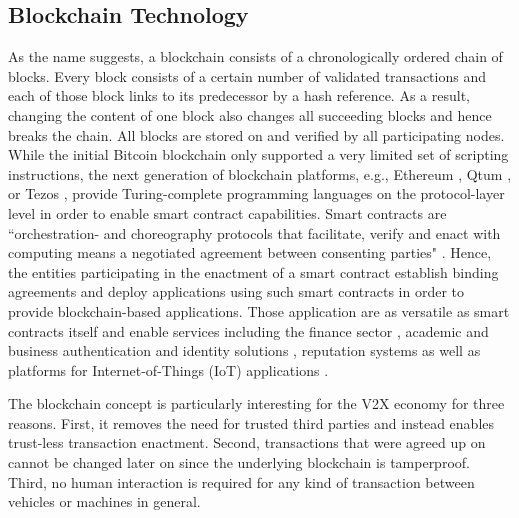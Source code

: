 \documentclass{llncs}
\begin{document}
{		%
		
		\subsection{Blockchain Technology}
			\label{ss:blockchain-intro}
			
			As the name suggests, a blockchain consists of a chronologically ordered chain of blocks. Every block consists of a certain number of validated transactions and each of those block links to its predecessor by a hash reference. As a result, changing the content of one block also changes all succeeding blocks and hence breaks the chain. All blocks are stored on and verified by all participating nodes. While the initial Bitcoin blockchain only supported a very limited set of scripting instructions, the next generation of blockchain platforms, e.g., Ethereum \cite{wood2014ethereum}, Qtum \cite{qtumWhitepaper}, or Tezos \cite{tezosWhitepaper}, provide Turing-complete programming languages on the protocol-layer level in order to enable smart contract capabilities. Smart contracts are ``orchestration- and choreography protocols that facilitate, verify and enact with computing means a negotiated agreement between consenting parties" \cite{qtumWhitepaper}. Hence, the entities participating in the enactment of a smart contract establish binding agreements and deploy applications using such smart contracts in order to provide blockchain-based applications. Those application are as versatile as smart contracts itself and enable services including the finance sector \cite{nguyen2016blockchain}\cite{saltWhitepaper}, academic and business authentication and identity solutions \cite{leidingUnchained}\cite{CivicWhitepaper}\cite{AuthcoinLeiding2016MCIS}\cite{mccorry2015authenticated}\cite{SelfkeyWhitepaper}, reputation systems \cite{SemadaWhitepaper} as well as platforms for Internet-of-Things (IoT) applications \cite{christidis2016blockchains}\cite{ouaddah2017towards}. 	
			
			The blockchain concept is particularly interesting for the V2X economy for three reasons. First, it removes the need for trusted third parties and instead enables trust-less transaction enactment. Second, transactions that were agreed up on cannot be changed later on since the underlying blockchain is tamperproof. Third, no human interaction is required for any kind of transaction between vehicles or machines in general.

}
\end{document}
